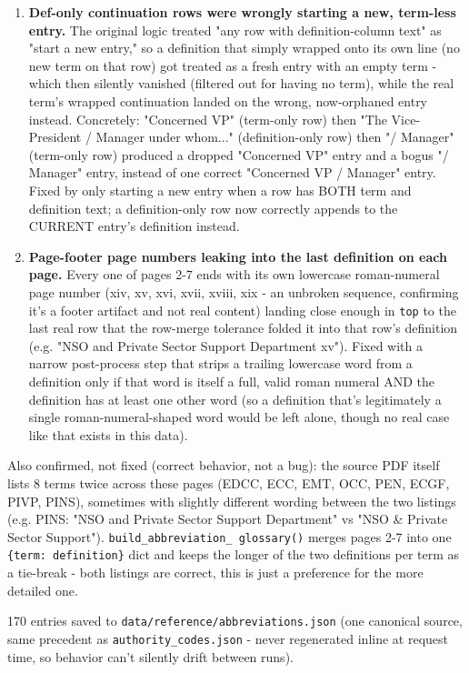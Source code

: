 \begin{enumerate}
\item \textbf{Def-only continuation rows were wrongly starting a new, term-less entry.} The original logic treated "any row with definition-column text" as "start a new entry," so a definition that simply wrapped onto its own line (no new term on that row) got treated as a fresh entry with an empty term - which then silently vanished (filtered out for having no term), while the real term's wrapped continuation landed on the wrong, now-orphaned entry instead. Concretely: "Concerned VP" (term-only row) then "The Vice-President / Manager under whom..." (definition-only row) then "/ Manager" (term-only row) produced a dropped "Concerned VP" entry and a bogus "/ Manager" entry, instead of one correct "Concerned VP / Manager" entry. Fixed by only starting a new entry when a row has BOTH term and definition text; a definition-only row now correctly appends to the CURRENT entry's definition instead.
\item \textbf{Page-footer page numbers leaking into the last definition on each page.} Every one of pages 2-7 ends with its own lowercase roman-numeral page number (xiv, xv, xvi, xvii, xviii, xix - an unbroken sequence, confirming it's a footer artifact and not real content) landing close enough in \texttt{top} to the last real row that the row-merge tolerance folded it into that row's definition (e.g. "NSO and Private Sector Support Department xv"). Fixed with a narrow post-process step that strips a trailing lowercase word from a definition only if that word is itself a full, valid roman numeral AND the definition has at least one other word (so a definition that's legitimately a single roman-numeral-shaped word would be left alone, though no real case like that exists in this data).
\end{enumerate}
Also confirmed, not fixed (correct behavior, not a bug): the source PDF itself lists 8 terms twice across these pages (EDCC, ECC, EMT, OCC, PEN, ECGF, PIVP, PINS), sometimes with slightly different wording between the two listings (e.g. PINS: "NSO and Private Sector Support Department" vs "NSO \& Private Sector Support"). \texttt{build\_\allowbreak{}abbreviation\_\allowbreak{} glossary()} merges pages 2-7 into one \texttt{\{term: definition\}} dict and keeps the longer of the two definitions per term as a tie-break - both listings are correct, this is just a preference for the more detailed one.

170 entries saved to \texttt{data/\allowbreak{}reference/\allowbreak{}abbreviations.json} (one canonical source, same precedent as \texttt{authority\_\allowbreak{}codes.json} - never regenerated inline at request time, so behavior can't silently drift between runs).

